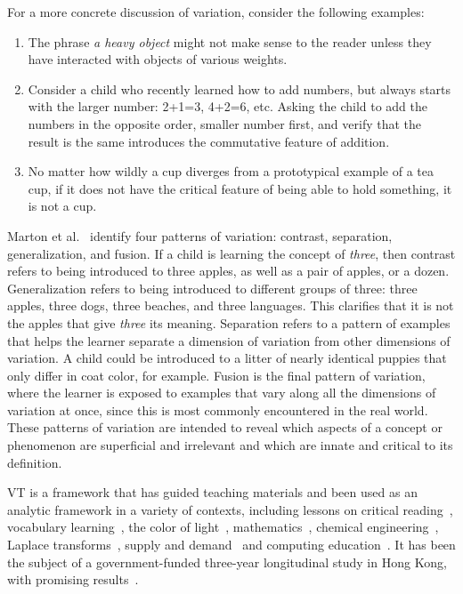For a more concrete discussion of variation, consider the following examples:
\begin{enumerate}
\item The phrase {\it a heavy object} might not make sense to the reader unless they have interacted with objects of various weights.
\item Consider a child who recently learned how to add numbers, but always starts with the larger number: 2+1=3, 4+2=6, etc. Asking the child to add the numbers in the opposite order, smaller number first, and verify that the result is the same introduces the commutative feature of addition.
\item No matter how wildly a cup diverges from a prototypical example of a tea cup, if it does not have the critical feature of being able to hold something, it is not a cup.
\end{enumerate}

Marton et al.~\cite{marton1997learning} identify four patterns of variation: contrast, separation, generalization, and fusion. If a child is learning the concept of {\it three}, then contrast refers to being introduced to three apples, as well as a pair of apples, or a dozen. Generalization refers to being introduced to different groups of three: three apples, three dogs, three beaches, and three languages. This clarifies that it is not the apples that give {\it three} its meaning. Separation refers to a pattern of examples that helps the learner separate a dimension of variation from other dimensions of variation. A child could be introduced to a litter of nearly identical puppies that only differ in coat color, for example. Fusion is the final pattern of variation, where the learner is exposed to examples that vary along all the dimensions of variation at once, since this is most commonly encountered in the real world. These patterns of variation are intended to reveal which aspects of a concept or phenomenon are superficial and irrelevant and which are innate and critical to its definition.

VT is a framework that has guided teaching materials and been used as an analytic framework in a variety of contexts, including lessons on critical reading~\cite{noble1998contents}, vocabulary learning~\cite{doi:10.1108/IJLLS-10-2014-0038}, the color of light~\cite{Ling2006}, mathematics~\cite{Pythagoras233}, chemical engineering~\cite{C2RP20145C}, Laplace transforms~\cite{carstensen2004laplace}, supply and demand~\cite{marton2006some} and computing education~\cite{suhonen2007applications}. It has been the subject of a government-funded three-year longitudinal study in Hong Kong, with promising results~\cite{lo2005each}. 

